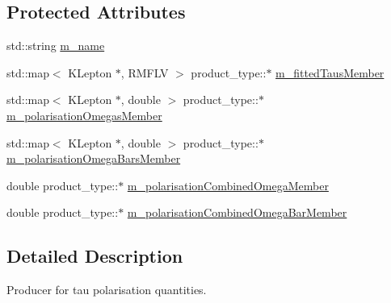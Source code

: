 \subsection*{Protected Attributes}
\begin{DoxyCompactItemize}
\item 
std::string \hyperlink{classPolarisationQuantitiesProducerBase_a1ee4910a58bd6e57ca427c4c9d57985a}{m\_\-name}
\item 
std::map$<$ KLepton $\ast$, RMFLV $>$ product\_\-type::$\ast$ \hyperlink{classPolarisationQuantitiesProducerBase_ab062345a7866a3e9abe388ec318fda7d}{m\_\-fittedTausMember}
\item 
std::map$<$ KLepton $\ast$, double $>$ product\_\-type::$\ast$ \hyperlink{classPolarisationQuantitiesProducerBase_a171e0552f9f8eff15e55460044e0910f}{m\_\-polarisationOmegasMember}
\item 
std::map$<$ KLepton $\ast$, double $>$ product\_\-type::$\ast$ \hyperlink{classPolarisationQuantitiesProducerBase_a5b31ced54f7c19434ec5d108a07a1692}{m\_\-polarisationOmegaBarsMember}
\item 
double product\_\-type::$\ast$ \hyperlink{classPolarisationQuantitiesProducerBase_ab4041d5aa4185afb505947442aedd23a}{m\_\-polarisationCombinedOmegaMember}
\item 
double product\_\-type::$\ast$ \hyperlink{classPolarisationQuantitiesProducerBase_a19d47f90ed7769fa7114c07afb383937}{m\_\-polarisationCombinedOmegaBarMember}
\end{DoxyCompactItemize}


\subsection{Detailed Description}
Producer for tau polarisation quantities. 

